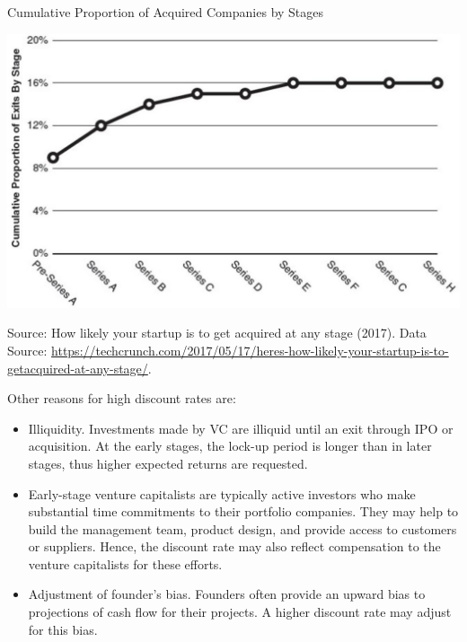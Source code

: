 \documentclass[11pt]{article}
\begin{document}
Cumulative Proportion of Acquired Companies by Stages

\begin{center}
\includegraphics[max width=\textwidth]{2024_04_10_d4c2572c2ae315d9c9f2g-7}
\end{center}

Source: How likely your startup is to get acquired at any stage (2017). Data Source: \href{https://techcrunch.com/2017/05/17/heres-how-likely-your-startup-is-to-getacquired-at-any-stage/}{https://techcrunch.com/2017/05/17/heres-how-likely-your-startup-is-to-getacquired-at-any-stage/}.

Other reasons for high discount rates are:

\begin{itemize}
  \item Illiquidity. Investments made by VC are illiquid until an exit through IPO or acquisition. At the early stages, the lock-up period is longer than in later stages, thus higher expected returns are requested.
  \item Early-stage venture capitalists are typically active investors who make substantial time commitments to their portfolio companies. They may help to build the management team, product design, and provide access to customers or suppliers. Hence, the discount rate may also reflect compensation to the venture capitalists for these efforts.
  \item Adjustment of founder's bias. Founders often provide an upward bias to projections of cash flow for their projects. A higher discount rate may adjust for this bias.
\end{itemize}
\end{document}
